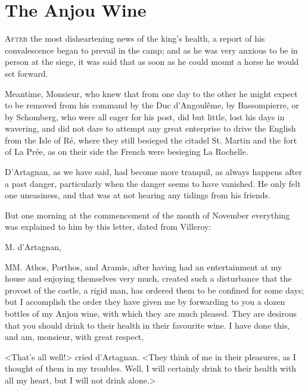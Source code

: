 
\chapter{The Anjou Wine}

\lettrine[]{A}{fter} the most disheartening news of the king's health, a report of his convalescence began to prevail in the camp; and as he was very anxious to be in person at the siege, it was said that as soon as he could mount a horse he would set forward. 

Meantime, Monsieur, who knew that from one day to the other he might expect to be removed from his command by the Duc d'Angoulême, by Bassompierre, or by Schomberg, who were all eager for his post, did but little, lost his days in wavering, and did not dare to attempt any great enterprise to drive the English from the Isle of Ré, where they still besieged the citadel St. Martin and the fort of La Prée, as on their side the French were besieging La Rochelle. 

D'Artagnan, as we have said, had become more tranquil, as always happens after a past danger, particularly when the danger seems to have vanished. He only felt one uneasiness, and that was at not hearing any tidings from his friends. 

But one morning at the commencement of the month of November everything was explained to him by this letter, dated from Villeroy: 
\begin{mail}{}{M. d'Artagnan,} 
	
	MM. Athos, Porthos, and Aramis, after having had an entertainment at my house and enjoying themselves very much, created such a disturbance that the provost of the castle, a rigid man, has ordered them to be confined for some days; but I accomplish the order they have given me by forwarding to you a dozen bottles of my Anjou wine, with which they are much pleased. They are desirous that you should drink to their health in their favourite wine. I have done this, and am, monsieur, with great respect, 
	\end{mail}

<That's all well!> cried d'Artagnan. <They think of me in their pleasures, as I thought of them in my troubles. Well, I will certainly drink to their health with all my heart, but I will not drink alone.> 


